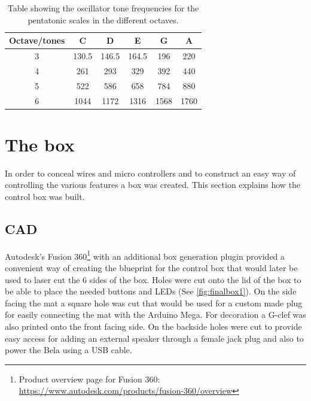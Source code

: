 	\begin{table}[H]
		\centering
		\caption{Table showing the oscillator tone frequencies for the pentatonic scales in the different octaves.}
		\label{tab:toneFreq}
		\begin{tabular}{|c|c|c|c|c|c|}
			\hline
			Octave/tones & C     & D     & E     & G    & A    \\ \hline
			3            & 130.5 & 146.5 & 164.5 & 196  & 220  \\ \hline
			4            & 261   & 293   & 329   & 392  & 440  \\ \hline
			5            & 522   & 586   & 658   & 784  & 880  \\ \hline
			6            & 1044  & 1172  & 1316  & 1568 & 1760 \\ \hline
		\end{tabular}
	\end{table}
	



\section{The box}%
In order to conceal wires and micro controllers and to construct an easy way of controlling the various features a box was created. This section explains how the control box was built.

	\subsection{CAD}
	Autodesk's Fusion 360\footnote{Product overview page for Fusion 360: \url{https://www.autodesk.com/products/fusion-360/overview}} with an additional box generation plugin provided a convenient way of creating the blueprint for the control box that would later be used to laser cut the 6 sides of the box. Holes were cut onto the lid of the box to be able to place the needed buttons and LEDs (See \autoref{fig:finalbox1}). On the side facing the mat a square hole was cut that would be used for a custom made plug for easily connecting the mat with the Arduino Mega. For decoration a G-clef was also printed onto the front facing side. On the backside holes were cut to provide easy access for adding an external speaker through a female jack plug and also to power the Bela using a USB cable.
	
